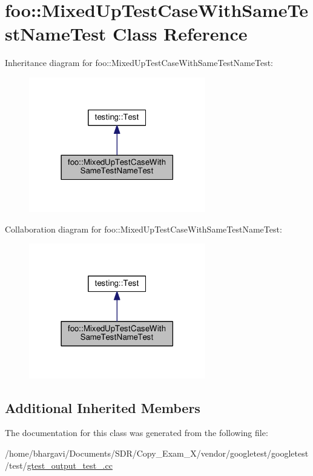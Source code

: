 \hypertarget{classfoo_1_1_mixed_up_test_case_with_same_test_name_test}{}\section{foo\+:\+:Mixed\+Up\+Test\+Case\+With\+Same\+Test\+Name\+Test Class Reference}
\label{classfoo_1_1_mixed_up_test_case_with_same_test_name_test}


Inheritance diagram for foo\+:\+:Mixed\+Up\+Test\+Case\+With\+Same\+Test\+Name\+Test\+:
\nopagebreak
\begin{figure}[H]
\begin{center}
\leavevmode
\includegraphics[width=218pt]{classfoo_1_1_mixed_up_test_case_with_same_test_name_test__inherit__graph}
\end{center}
\end{figure}


Collaboration diagram for foo\+:\+:Mixed\+Up\+Test\+Case\+With\+Same\+Test\+Name\+Test\+:
\nopagebreak
\begin{figure}[H]
\begin{center}
\leavevmode
\includegraphics[width=218pt]{classfoo_1_1_mixed_up_test_case_with_same_test_name_test__coll__graph}
\end{center}
\end{figure}
\subsection*{Additional Inherited Members}


The documentation for this class was generated from the following file\+:\begin{DoxyCompactItemize}
\item 
/home/bhargavi/\+Documents/\+S\+D\+R/\+Copy\+\_\+\+Exam\+\_\+X/vendor/googletest/googletest/test/\hyperlink{gtest__output__test___8cc}{gtest\+\_\+output\+\_\+test\+\_\+.\+cc}\end{DoxyCompactItemize}
